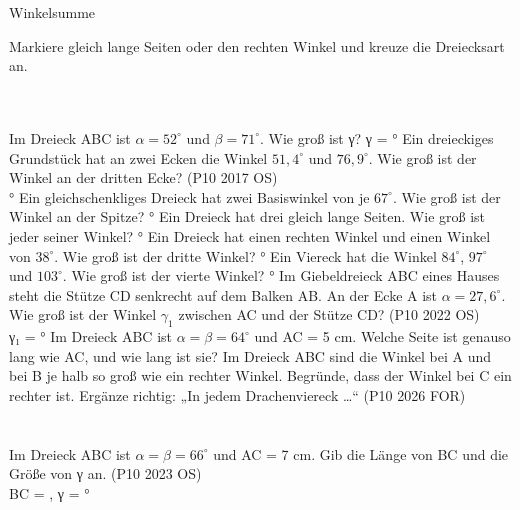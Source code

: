 \begin{aufgabe}{Winkelsumme}
\begin{teile}
\teil Markiere gleich lange Seiten oder den rechten Winkel und kreuze die Dreiecksart an. \\  \\  \\ 

\teil Im Dreieck ABC ist $\alpha = 52^\circ$ und $\beta = 71^\circ$. Wie groß ist γ? γ = \leerfeld °
\teil Ein dreieckiges Grundstück hat an zwei Ecken die Winkel $51{,}4^\circ$ und $76{,}9^\circ$. Wie groß ist der Winkel an der dritten Ecke? \hfill (P10 2017 OS) \\ \leerfeld °
\teil Ein gleichschenkliges Dreieck hat zwei Basiswinkel von je $67^\circ$. Wie groß ist der Winkel an der Spitze? \leerfeld °
\teil Ein Dreieck hat drei gleich lange Seiten. Wie groß ist jeder seiner Winkel? \leerfeld °
\teil Ein Dreieck hat einen rechten Winkel und einen Winkel von $38^\circ$. Wie groß ist der dritte Winkel? \leerfeld °
\teil Ein Viereck hat die Winkel $84^\circ$, $97^\circ$ und $103^\circ$. Wie groß ist der vierte Winkel? \leerfeld °
\teil Im Giebeldreieck ABC eines Hauses steht die Stütze CD senkrecht auf dem Balken AB. An der Ecke A ist $\alpha = 27{,}6^\circ$. Wie groß ist der Winkel $\gamma_1$ zwischen AC und der Stütze CD? \hfill (P10 2022 OS) \\ γ₁ = \leerfeld °
\teil Im Dreieck ABC ist $\alpha = \beta = 64^\circ$ und AC = 5 cm. Welche Seite ist genauso lang wie AC, und wie lang ist sie?
\teil Im Dreieck ABC sind die Winkel bei A und bei B je halb so groß wie ein rechter Winkel. Begründe, dass der Winkel bei C ein rechter ist.
\teil Ergänze richtig: „In jedem Drachenviereck …“ \hfill (P10 2026 FOR) \\  \\  \\ 
\teil Im Dreieck ABC ist $\alpha = \beta = 66^\circ$ und AC = 7 cm. Gib die Länge von BC und die Größe von γ an. \hfill (P10 2023 OS) \\ BC = \leerfeld[cm] , γ = \leerfeld °
\end{teile}
\end{aufgabe}

